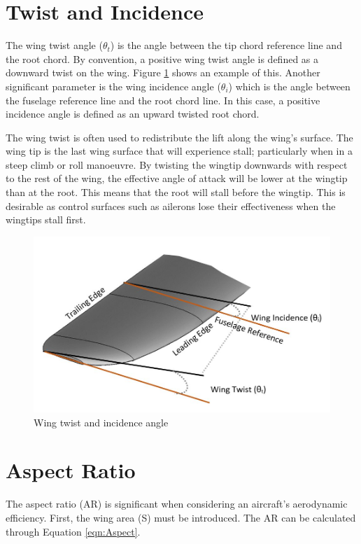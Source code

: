 \section{Twist and Incidence}
The wing twist angle ($\theta_t$) is the angle between the tip chord reference line and the root chord. By convention, a positive wing twist angle is defined as a downward twist on the wing. Figure \ref{fig:twist} shows an example of this. Another significant parameter is the wing incidence angle ($\theta_i$) which is the angle between the fuselage reference line and the root chord line. In this case, a positive incidence angle is defined as an upward twisted root chord. 

The wing twist is often used to redistribute the lift along the wing's surface. The wing tip is the last wing surface that will experience stall; particularly when in a steep climb or roll manoeuvre. By twisting the wingtip downwards with respect to the rest of the wing, the effective angle of attack will be lower at the wingtip than at the root. This means that the root will stall before the wingtip. This is desirable as control surfaces such as ailerons lose their effectiveness when the wingtips stall first. 


\begin{figure}[H]
  \centering
  \includegraphics[width=1\linewidth]{02_Background/Figs/wingo.JPG}
  \caption{Wing twist and incidence angle}
  \label{fig:twist}
\end{figure}

\section{Aspect Ratio}
The aspect ratio (AR) is significant when considering an aircraft's aerodynamic efficiency. First, the wing area (S) must be introduced. The AR can be calculated through Equation \ref{eqn:Aspect}.

